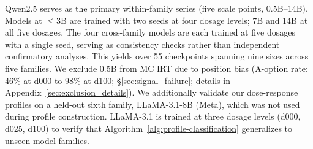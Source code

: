Qwen2.5 serves as the primary within-family series (five scale points, 0.5B--14B). Models at $\leq$3B are trained with two seeds at four dosage levels; 7B and 14B at all five dosages. The four cross-family models are each trained at five dosages with a single seed, serving as consistency checks rather than independent confirmatory analyses. This yields over 55 checkpoints spanning nine sizes across five families. We exclude 0.5B from MC IRT due to position bias (A-option rate: 46\% at d000 to 98\% at d100; \S\ref{sec:signal_failure}; details in Appendix~\ref{sec:exclusion_details}). We additionally validate our dose-response profiles on a held-out sixth family, LLaMA-3.1-8B \citep{grattafiori2024llama3} (Meta), which was not used during profile construction. LLaMA-3.1 is trained at three dosage levels (d000, d025, d100) to verify that Algorithm~\ref{alg:profile-classification} generalizes to unseen model families.

\begin{table}[t]
\centering
\caption{Cross-seed $\Delta$acc (d000$\to$d100). Strict sign consistency (Cons.) is 3/6; classification-level direction agreement is 5/6 (see text). Per-seed shape classification\textsuperscript{$\ddagger$} agrees for only 3/6.}
\label{tab:cross_seed}
\footnotesize
{}
\end{table}

